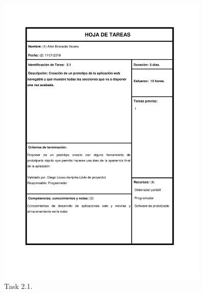 \documentclass{DeustoFDP}
\begin{document}
\begin{figure}[H]
	\centering
	\includegraphics[width=0.9\textwidth]{fig/Tareas/21}
	\caption{Task 2.1.}
	\label{fig:t21}
\end{figure}
\end{document}
